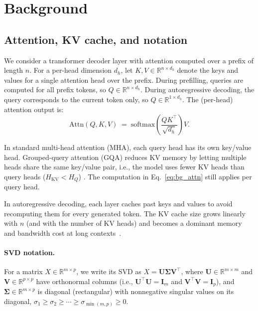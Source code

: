 \section{Background}
\label{sec:background}

\subsection{Attention, KV cache, and notation}
We consider a transformer decoder layer with attention computed over a prefix of length $n$.
For a per-head dimension $d_h$, let $K,V \in \mathbb{R}^{n \times d_h}$ denote the keys and values for a single attention head over the prefix.
During prefilling, queries are computed for all prefix tokens, so $Q \in \mathbb{R}^{n \times d_h}$.
During autoregressive decoding, the query corresponds to the current token only, so $Q \in \mathbb{R}^{1 \times d_h}$.
The (per-head) attention output is:
\begin{equation}
\mathrm{Attn}(Q,K,V) \;=\; \mathrm{softmax}\!\left(\frac{QK^\top}{\sqrt{d_h}}\right)V.
\label{eq:bg_attn}
\end{equation}

In standard multi-head attention (MHA), each query head has its own key/value head.
Grouped-query attention (GQA) reduces KV memory by letting multiple heads share the same key/value pair,
%
i.e., the model uses fewer KV heads than query heads ($H_{\mathrm{KV}} < H_Q$) \citep{gqa}.
The computation in Eq.~\eqref{eq:bg_attn} still applies per query head.

In autoregressive decoding, each layer caches past keys and values to avoid recomputing them for every generated token.
The KV cache size grows linearly with $n$ (and with the number of KV heads) and becomes a dominant memory and bandwidth cost at long contexts~\cite{scalingLLM}.


\paragraph{SVD notation.}
For a matrix $X \in \mathbb{R}^{m \times p}$, we write its SVD as
$X = \mathbf{U}\mathbf{\Sigma}\mathbf{V}^\top$,
where $\mathbf{U}\in\mathbb{R}^{m\times m}$ and $\mathbf{V}\in\mathbb{R}^{p\times p}$ have orthonormal columns (i.e., $\mathbf{U}^\top\mathbf{U}=\mathbf{I}_m$ and $\mathbf{V}^\top\mathbf{V}=\mathbf{I}_{p}$), and
$\mathbf{\Sigma}\in\mathbb{R}^{m\times p}$ is diagonal (rectangular) with nonnegative singular values on its diagonal,
$\sigma_1 \ge \sigma_2 \ge \cdots \ge \sigma_{\min(m,p)} \ge 0$.

